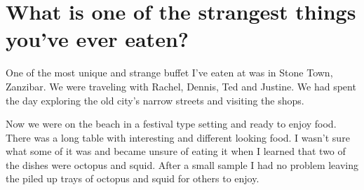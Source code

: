 \section{What is one of the strangest things you've ever eaten?}
One of the most unique and strange buffet I've eaten at was in Stone Town, Zanzibar.
We were traveling with Rachel, Dennis, Ted and Justine.
We had spent the day exploring the old city's narrow streets and visiting the shops.

Now we were on the beach in a festival type setting and ready to enjoy food.
There was a long table with interesting and different looking food.
I wasn't sure what some of it was and became unsure of eating it when I learned that two of the dishes were octopus and squid.
After a small sample I had no problem leaving the piled up trays of octopus and squid for others to enjoy.








